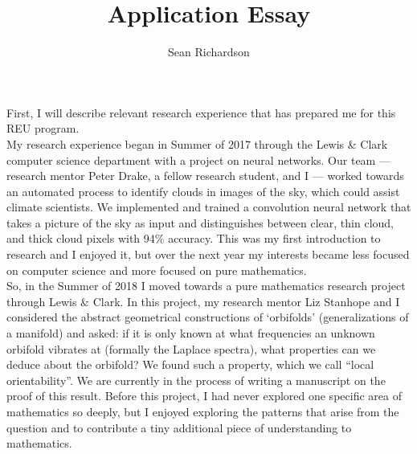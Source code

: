 \documentclass[12pt]{amsart}
\begin{document}
\title{Application Essay}
\author{Sean Richardson}
\maketitle

First, I will describe relevant research experience that has prepared me
for this REU program.\\

My research experience began in Summer of 2017 through the Lewis \& Clark
computer science department with a project on neural networks. Our team ---
research mentor Peter Drake, a fellow research student, and I --- worked
towards an automated process to identify clouds in images of the sky, which
could assist climate scientists. We implemented and trained a convolution
neural network that takes a picture of the sky as input and distinguishes
between clear, thin cloud, and thick cloud pixels with 94\% accuracy. This
was my first introduction to research and I enjoyed it, but over the next
year my interests became less focused on computer science and more focused
on pure mathematics.\\

So, in the Summer of 2018 I moved towards a pure mathematics research
project through Lewis \& Clark. In this project, my research mentor Liz
Stanhope and I considered the abstract geometrical constructions of
‘orbifolds’ (generalizations of a manifold) and asked: if it is only known
at what frequencies an unknown orbifold vibrates at (formally the Laplace
spectra), what properties can we deduce about the orbifold? We found such a
property, which we call ``local orientability''. We are currently in the
process of writing a manuscript on the proof of this result. Before this
project, I had never explored one specific area of mathematics so deeply,
but I enjoyed exploring the patterns that arise from the question and to
contribute a tiny additional piece of understanding to mathematics.\\
\end{document}
